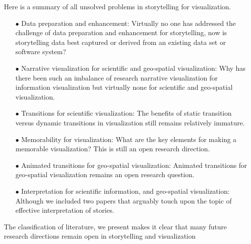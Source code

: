 \documentclass{egpubl}
\begin{document}
Here is a summary of  all unsolved problems in storytelling for visualization.
\begin{enumerate}
\item[$\bullet$] Data preparation and enhancement: Virtually no one has addressed the challenge of data preparation and enhancement for storytelling, now is storytelling data best captured or derived from an existing data set or software system?
\item[$\bullet$] Narrative visualization for scientific and geo-spatial visualization: Why has there been such an imbalance of research narrative visualization for information visualization but virtually none for scientific and geo-spatial visualization.
\item[$\bullet$] Transitions for scientific visualization: The benefits of static transition versus dynamic transitions in visualization still remains relatively immature.
\item[$\bullet$] Memorability for visualization: What are the key elements for making a memorable visualization? This is still an open research direction.
\item[$\bullet$] Animated transitions for geo-spatial visualization: Animated transitions for geo-spatial visualization remains an open research question.
\item[$\bullet$] Interpretation for scientific information, and geo-spatial visualization: Although we included two papers that arguably touch upon the topic of effective interpretation of stories.
\end{enumerate}

The classification of literature, we present makes it clear that many future research directions remain open in storytelling and visualization

\newpage
%



\end{document}

